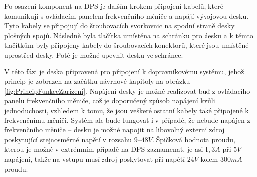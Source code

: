 Po osazení komponent na DPS je dalším krokem připojení kabelů, které komunikují s ovládacím panelem frekvenčního měniče a napájí vývojovou desku. Tyto kabely se připojují do šroubovacích svorkovnic na spodní straně desky plošných spojů. Následně byla tlačítka umístěna na schránku pro desku a k těmto tlačítkům byly připojeny kabely do šroubovacích konektorů, které jsou umístěné uprostřed desky. Poté je možné upevnit desku ve schránce.

V této fázi je deska připravená pro připojení k dopravníkovému systému, jehož princip je zobrazen na začátku návrhové kapitoly na obrázku \ref{fig:PrincipFunkceZarizeni}. Napájení desky je možné realizovat buď z ovládacího panelu frekvenčního měniče, což je doporučený způsob napájení kvůli jednoduchosti, vzhledem k tomu, že jsou veškeré ostatní kabely také připojené k frekvenčnímu měniči. Systém ale bude fungovat i v případě, že nebude napájen z frekvenčního měniče – desku je možné napojit na libovolný externí zdroj poskytující stejnosměrné napětí v rozsahu $9–48V$. Špičková hodnota proudu, kterou je možné v extrémním případě na DPS zaznamenat, je asi $1,3A$ při $5V$ napájení, takže na vstupu musí zdroj poskytovat při napětí $24V$ kolem $300mA$ proudu.